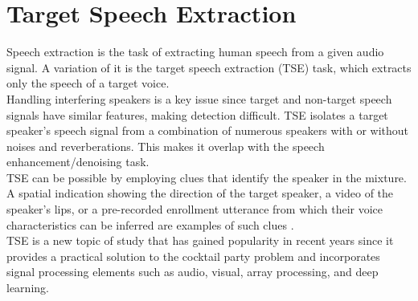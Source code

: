 \section{Target Speech Extraction}
Speech extraction is the task of extracting human speech from a given audio signal. A variation of it is the target speech extraction (TSE) task, which extracts only the speech of a target voice. \\
Handling interfering speakers is a key issue since target and non-target speech signals have similar features, making detection difficult. TSE isolates a target speaker's speech signal from a combination of numerous speakers with or without noises and reverberations. This makes it overlap with the speech enhancement/denoising task. \\
TSE can be possible by employing clues that identify the speaker in the mixture. A spatial indication showing the direction of the target speaker, a video of the speaker's lips, or a pre-recorded enrollment utterance from which their voice characteristics can be inferred are examples of such clues \cite{zmolikova2023}. \\
TSE is a new topic of study that has gained popularity in recent years since it provides a practical solution to the cocktail party problem \cite{bronkhorst2015} and incorporates signal processing elements such as audio, visual, array processing, and deep learning.
